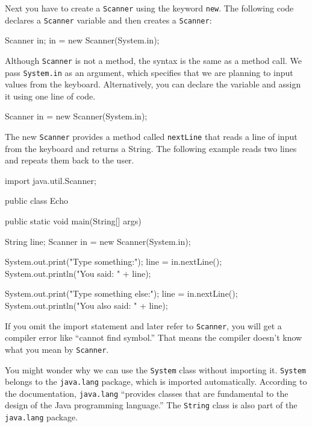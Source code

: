 \documentclass[12pt]{book}
\theoremstyle{exercise}
\newcommand{\java}[1]{\verb"#1"}
\newcommand{\java}[1]{\lstinline{#1}} %
\begin{document}
Next you have to create a \java{Scanner} using the keyword \java{new}.
The following code declares a \java{Scanner} variable and then creates a \java{Scanner}:

\begin{code}
    Scanner in;
    in = new Scanner(System.in);
\end{code}


Although \java{Scanner} is not a method, the syntax is the same as a method call.
We pass \java{System.in} as an argument, which specifies that we are planning to input values from the keyboard.
Alternatively, you can declare the variable and assign it using one line of code.

\begin{code}
    Scanner in = new Scanner(System.in);
\end{code}

The new \java{Scanner} provides a method called \java{nextLine} that reads a line of input from the keyboard and returns a String.
The following example reads two lines and repeats them back to the user.

\begin{code}
import java.util.Scanner;

public class Echo {
    public static void main(String[] args) {
        String line;
        Scanner in = new Scanner(System.in);

        System.out.print("Type something:");
        line = in.nextLine();
        System.out.println("You said: " + line);

        System.out.print("Type something else:");
        line = in.nextLine();
        System.out.println("You also said: " + line);
    }
}
\end{code}

If you omit the import statement and later refer to \java{Scanner}, you will get a compiler error like ``cannot find symbol.''
That means the compiler doesn't know what you mean by \java{Scanner}.

You might wonder why we can use the \java{System} class without importing it.
\java{System} belongs to the \java{java.lang} package, which is imported automatically.
According to the documentation, \java{java.lang} ``provides classes that are fundamental to the design of the Java programming language.''
The \java{String} class is also part of the \java{java.lang} package.
\end{document}
